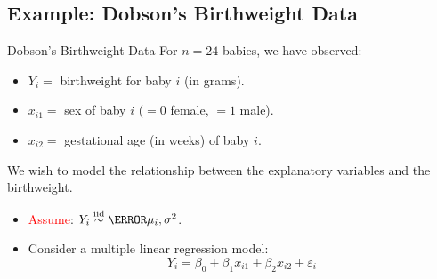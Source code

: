 \documentclass[oneside]{book}\usepackage[]{graphicx}\usepackage[svgnames]{xcolor}
\newcommand{\iid}{\overset{\text{iid}}{\sim}}%
\begin{document}
\subsection*{Example: Dobson's Birthweight Data}
\begin{Example}{Dobson's Birthweight Data}{}
      For $ n=24 $ babies, we have observed:
      \begin{itemize}
            \item $ Y_i= $ birthweight for baby $ i $ (in grams).
            \item $ x_{i1}= $ sex of baby $ i $ ($ =0 $ female, $ =1 $ male).
            \item $ x_{i2}= $ gestational age (in weeks) of baby $ i $.
      \end{itemize}
      We wish to model the relationship between the explanatory variables and the
      birthweight.
\end{Example}
\begin{itemize}
      \item \textcolor{red}{Assume}: $ Y_i \iid\N{\mu_i,\sigma^2} $.
      \item Consider a multiple linear regression model:
            \[ Y_i=\beta_0+\beta_1x_{i1}+\beta_2 x_{i2}+\varepsilon_i \]
\end{itemize}
\end{document}
